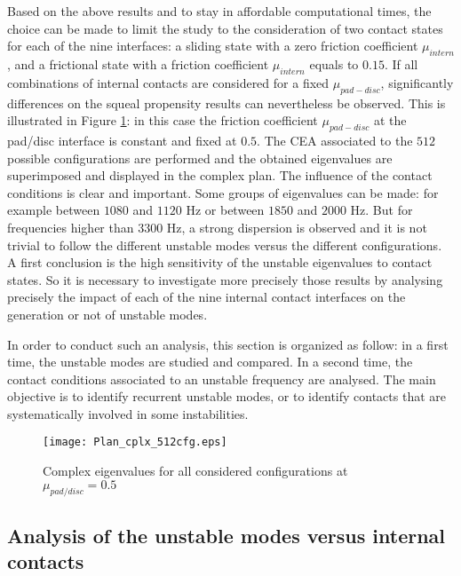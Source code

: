 \documentclass[final,1p]{elsarticle}
\begin{document}
Based on the above results and to stay in affordable computational times, the choice can be made to limit the study to the consideration of two contact states for each of the nine interfaces: a sliding state with a zero friction coefficient  $\mu_{intern}$, and a frictional state with a friction coefficient $\mu_{intern}$ equals to $0.15$. If all combinations of internal contacts are considered for a fixed $\mu_{pad-disc}$, significantly differences on the squeal propensity results can nevertheless be observed. This is illustrated in Figure \ref{fig:PlanCplx512}: in this case the friction coefficient $\mu_{pad-disc}$ at the pad/disc interface is constant and fixed at $0.5$. The CEA associated to the $512$ possible configurations are performed and the obtained eigenvalues are superimposed and displayed in the complex plan. The influence of the contact conditions is clear and important. Some groups of eigenvalues can be made: for example between $1080$ and $1120$ Hz or between $1850$ and $2000$ Hz. But for frequencies higher than $3300$ Hz, a strong dispersion is observed and it is not trivial to follow the different unstable modes versus the different configurations. A first conclusion is the high sensitivity of the unstable eigenvalues to contact states. So it is necessary to investigate more precisely those results by analysing precisely the impact of each of the nine internal contact interfaces on the generation or not of unstable modes.

In order to conduct such an analysis, this section is organized as follow: in a first time, the unstable modes are studied and compared. In a second time, the contact conditions associated to an unstable frequency are analysed. The main objective is to identify recurrent unstable modes, or to identify contacts that are systematically involved in some instabilities.

\begin{figure}[h!]
\hspace{-3cm}
\texttt{[image: Plan\_cplx\_512cfg.eps]}
\caption{Complex eigenvalues for all considered configurations at $\mu_{pad/disc}=0.5$}
\label{fig:PlanCplx512}
\end{figure}


\subsection{Analysis of the unstable modes versus internal contacts}
\label{sec:}
\end{document}
